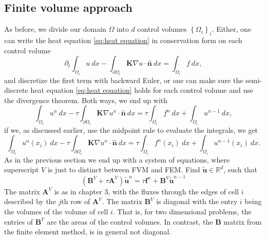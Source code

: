 \documentclass[../Main/main.tex]{subfiles}
\begin{document}
	\subsection*{Finite volume approach}
	As before, we divide our domain $\Omega$ into $d$ control volumes $\left \{ \Omega_i \right \}_i$. Either, one can write the heat equation \eqref{eq:heat equation} in conservation form on each control volume
	\begin{equation}\label{eq:semidiscrete FVM}
		\partial_t\int_{\Omega_i}u \ dx -\int_{\partial \Omega_i} \bm{K}\nabla u \cdot \hat{\bm{n}}\ dx = \int_{\Omega_i} f \ dx,
	\end{equation}
	and discretize the first term with backward Euler, or one can make sure the semi-discrete heat equation \eqref{eq:heat equation} holds for each control volume and use the divergence theorem. Both ways, we end up with
	\begin{equation}
		\int_{\Omega_i} u^n \ dx - \tau\int_{\partial \Omega_i} \bm{K}\nabla u^n \cdot \hat{\bm{n}}\ dx = \tau \int_{\Omega_i} f^n \ dx + \int_{\Omega_i} u^{n-1} \ dx,
	\end{equation}
	if we, as discussed earlier, use the midpoint rule to evaluate the integrals, we get
	\begin{equation}
		\int_{\Omega_i} u^n(x_i) \ dx - \tau\int_{\partial \Omega_i} \bm{K}\nabla u^n \cdot \hat{\bm{n}}\ dx = \tau \int_{\Omega_i} f^n(x_i) \ dx + \int_{\Omega_i} u^{n-1}(x_i) \ dx.
	\end{equation}
	As in the previous section we end up with a system of equations, where superscript $V$ is just to distinct between FVM and FEM. Find $\tilde{\bm{u}} \in \mathbb{R}^d$, such that
	\begin{equation}\label{eq:heat fvm disc}
		(\bm{B}^V + \tau \bm{A}^V)\tilde{\bm{u}}^n = \tau \bm{f}^n + \bm{B}^V\tilde{\bm{u}}^{n-1}
	\end{equation}
	The matrix $\bm{A}^V$ is as in chapter 3, with the fluxes through the edges of cell $i$ described by the $j$th row of $\bm{A}^V$. The matrix $\bm{B}^V$ is diagonal with the entry $i$ being the volumes of the volume of cell $i$. That is, for two dimensional problems, the entries of $\bm{B}^V$ are the areas of the control volumes. In contrast, the $\bm{B}$ matrix from the finite element method, is in general not diagonal.
\end{document}

